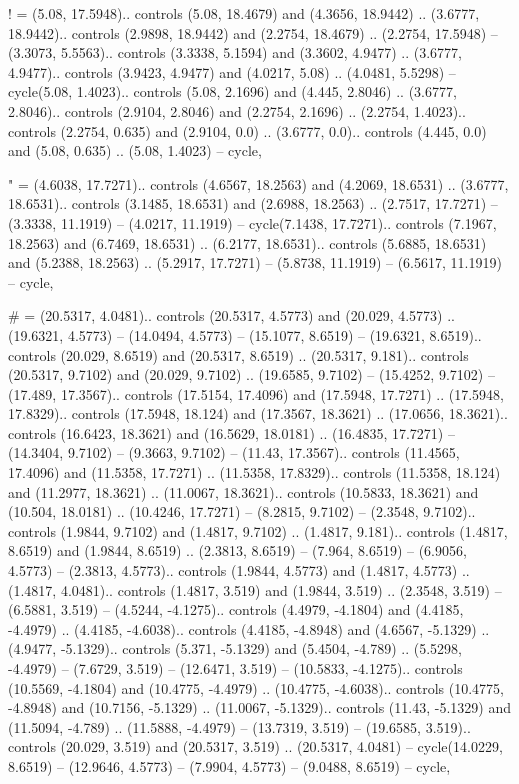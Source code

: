 ! = {(5.08, 17.5948).. controls (5.08, 18.4679) and (4.3656, 18.9442) .. (3.6777, 18.9442).. controls (2.9898, 18.9442) and (2.2754, 18.4679) .. (2.2754, 17.5948) -- (3.3073, 5.5563).. controls (3.3338, 5.1594) and (3.3602, 4.9477) .. (3.6777, 4.9477).. controls (3.9423, 4.9477) and (4.0217, 5.08) .. (4.0481, 5.5298) -- cycle(5.08, 1.4023).. controls (5.08, 2.1696) and (4.445, 2.8046) .. (3.6777, 2.8046).. controls (2.9104, 2.8046) and (2.2754, 2.1696) .. (2.2754, 1.4023).. controls (2.2754, 0.635) and (2.9104, 0.0) .. (3.6777, 0.0).. controls (4.445, 0.0) and (5.08, 0.635) .. (5.08, 1.4023) -- cycle},

" = {(4.6038, 17.7271).. controls (4.6567, 18.2563) and (4.2069, 18.6531) .. (3.6777, 18.6531).. controls (3.1485, 18.6531) and (2.6988, 18.2563) .. (2.7517, 17.7271) -- (3.3338, 11.1919) -- (4.0217, 11.1919) -- cycle(7.1438, 17.7271).. controls (7.1967, 18.2563) and (6.7469, 18.6531) .. (6.2177, 18.6531).. controls (5.6885, 18.6531) and (5.2388, 18.2563) .. (5.2917, 17.7271) -- (5.8738, 11.1919) -- (6.5617, 11.1919) -- cycle},

# = {(20.5317, 4.0481).. controls (20.5317, 4.5773) and (20.029, 4.5773) .. (19.6321, 4.5773) -- (14.0494, 4.5773) -- (15.1077, 8.6519) -- (19.6321, 8.6519).. controls (20.029, 8.6519) and (20.5317, 8.6519) .. (20.5317, 9.181).. controls (20.5317, 9.7102) and (20.029, 9.7102) .. (19.6585, 9.7102) -- (15.4252, 9.7102) -- (17.489, 17.3567).. controls (17.5154, 17.4096) and (17.5948, 17.7271) .. (17.5948, 17.8329).. controls (17.5948, 18.124) and (17.3567, 18.3621) .. (17.0656, 18.3621).. controls (16.6423, 18.3621) and (16.5629, 18.0181) .. (16.4835, 17.7271) -- (14.3404, 9.7102) -- (9.3663, 9.7102) -- (11.43, 17.3567).. controls (11.4565, 17.4096) and (11.5358, 17.7271) .. (11.5358, 17.8329).. controls (11.5358, 18.124) and (11.2977, 18.3621) .. (11.0067, 18.3621).. controls (10.5833, 18.3621) and (10.504, 18.0181) .. (10.4246, 17.7271) -- (8.2815, 9.7102) -- (2.3548, 9.7102).. controls (1.9844, 9.7102) and (1.4817, 9.7102) .. (1.4817, 9.181).. controls (1.4817, 8.6519) and (1.9844, 8.6519) .. (2.3813, 8.6519) -- (7.964, 8.6519) -- (6.9056, 4.5773) -- (2.3813, 4.5773).. controls (1.9844, 4.5773) and (1.4817, 4.5773) .. (1.4817, 4.0481).. controls (1.4817, 3.519) and (1.9844, 3.519) .. (2.3548, 3.519) -- (6.5881, 3.519) -- (4.5244, -4.1275).. controls (4.4979, -4.1804) and (4.4185, -4.4979) .. (4.4185, -4.6038).. controls (4.4185, -4.8948) and (4.6567, -5.1329) .. (4.9477, -5.1329).. controls (5.371, -5.1329) and (5.4504, -4.789) .. (5.5298, -4.4979) -- (7.6729, 3.519) -- (12.6471, 3.519) -- (10.5833, -4.1275).. controls (10.5569, -4.1804) and (10.4775, -4.4979) .. (10.4775, -4.6038).. controls (10.4775, -4.8948) and (10.7156, -5.1329) .. (11.0067, -5.1329).. controls (11.43, -5.1329) and (11.5094, -4.789) .. (11.5888, -4.4979) -- (13.7319, 3.519) -- (19.6585, 3.519).. controls (20.029, 3.519) and (20.5317, 3.519) .. (20.5317, 4.0481) -- cycle(14.0229, 8.6519) -- (12.9646, 4.5773) -- (7.9904, 4.5773) -- (9.0488, 8.6519) -- cycle},

